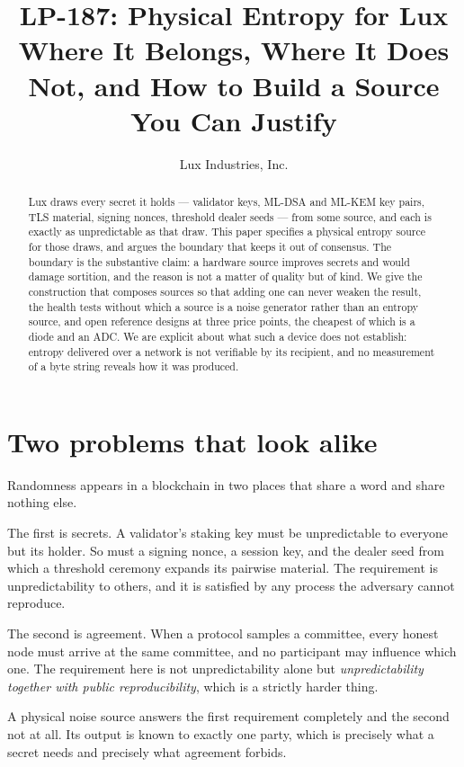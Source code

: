 \documentclass[11pt,a4paper]{article}
\title{LP-187: Physical Entropy for Lux\\Where It Belongs, Where It Does Not,
and How to Build a Source You Can Justify}
\author{Lux Industries, Inc.}
\begin{document}
\maketitle

\begin{abstract}
Lux draws every secret it holds --- validator keys, ML-DSA and ML-KEM key
pairs, TLS material, signing nonces, threshold dealer seeds --- from some
source, and each is exactly as unpredictable as that draw. This paper specifies
a physical entropy source for those draws, and argues the boundary that keeps
it out of consensus. The boundary is the substantive claim: a hardware source
improves secrets and would damage sortition, and the reason is not a matter of
quality but of kind. We give the construction that composes sources so that
adding one can never weaken the result, the health tests without which a source
is a noise generator rather than an entropy source, and open reference designs
at three price points, the cheapest of which is a diode and an ADC. We are
explicit about what such a device does not establish: entropy delivered over a
network is not verifiable by its recipient, and no measurement of a byte string
reveals how it was produced.
\end{abstract}

\tableofcontents
\newpage

\section{Two problems that look alike}

Randomness appears in a blockchain in two places that share a word and share
nothing else.

The first is secrets. A validator's staking key must be unpredictable to
everyone but its holder. So must a signing nonce, a session key, and the dealer
seed from which a threshold ceremony expands its pairwise material. The
requirement is unpredictability to others, and it is satisfied by any process
the adversary cannot reproduce.

The second is agreement. When a protocol samples a committee, every honest node
must arrive at the same committee, and no participant may influence which one.
The requirement here is not unpredictability alone but \emph{unpredictability
together with public reproducibility}, which is a strictly harder thing.

A physical noise source answers the first requirement completely and the second
not at all. Its output is known to exactly one party, which is precisely what a
secret needs and precisely what agreement forbids.
\end{document}

